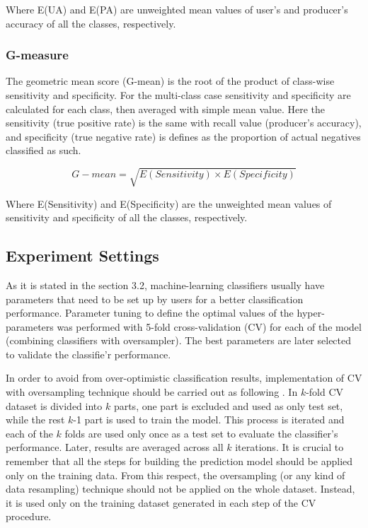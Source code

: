 \documentclass[parskip=full]{scrartcl}
\begin{document}
Where E(UA) and E(PA) are unweighted mean values of user's and producer's
accuracy of all the classes, respectively.

\subsubsection{G-measure}

The geometric mean score (G-mean) is the root of the product of class-wise
sensitivity and specificity. For the multi-class case sensitivity and
specificity are calculated for each class, then averaged with simple mean
value. Here the sensitivity (true positive rate) is the same with recall
value (producer's accuracy), and specificity (true negative rate) is defines as
the proportion of actual negatives classified as such.

\[
G{-}mean = \sqrt{E(Sensitivity) \times E(Specificity)}
\]

Where E(Sensitivity) and E(Specificity) are the unweighted mean values of
sensitivity and specificity of all the classes, respectively.


\subsection{Experiment Settings}

As it is stated in the section 3.2, machine-learning classifiers usually have
parameters that need to be set up by users for a better classification
performance. Parameter tuning to define the optimal values of the
hyper-parameters was performed with 5-fold cross-validation (CV) for each of
the model (combining classifiers with oversampler). The best parameters are
later selected to validate the classifie'r performance.

In order to avoid from over-optimistic classification results, implementation
of CV with oversampling technique should be carried out as following
\cite{Lusa2015}. In $k$-fold CV dataset is divided into $k$ parts, one part is
excluded and used as only test set, while the rest $k$-1 part is used to train
the model. This process is iterated and each of the $k$ folds are used only
once as a test set to evaluate the classifier's performance. Later, results are
averaged across all $k$ iterations. It is crucial to remember that
all the steps for building the prediction model should be applied only on the
training data. From this respect, the oversampling (or any kind of data
resampling) technique should not be applied on the whole dataset. Instead, it
is used only on the training dataset generated in each step of the CV
procedure.
\end{document}
